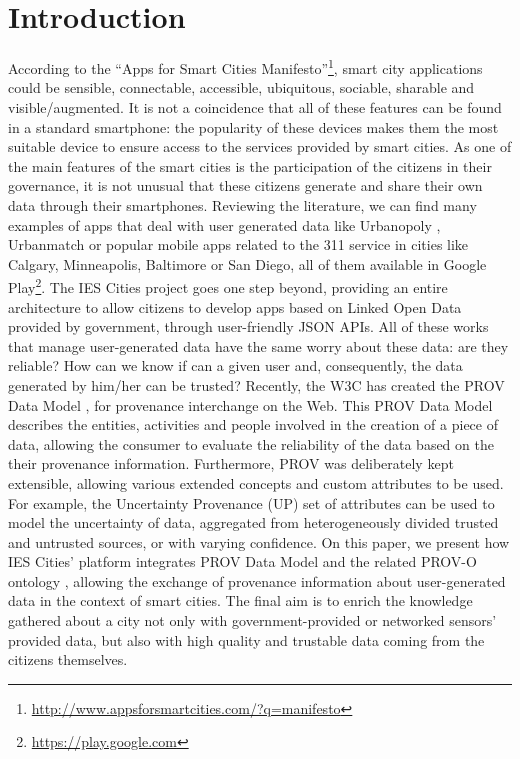 \section{Introduction}
\label{sec:introduction}

According to the ``Apps for Smart Cities Manifesto''\footnote{\url{http://www.appsforsmartcities.com/?q=manifesto}}, smart city applications could be sensible, connectable, accessible, ubiquitous, sociable, sharable and visible/augmented. It is not a coincidence that all of these features can be found in a standard smartphone: the popularity of these devices makes them the most suitable device to ensure access to the services provided by smart cities. As one of the main features of the smart cities is the participation of the citizens in their governance, it is not unusual that these citizens generate and share their own data through their smartphones. Reviewing the literature, we can find many examples of apps that deal with user generated data like Urbanopoly \cite{celino_urbanopoly_2012}, Urbanmatch \cite{celino_urbanmatch_2012} or popular mobile apps related to the 311 service in cities like Calgary, Minneapolis, Baltimore or San Diego, all of them available in Google Play\footnote{\url{https://play.google.com}}. The IES Cities project goes one step beyond, providing an entire architecture to allow citizens to develop apps based on Linked Open Data \cite{bizer_linked_2009} provided by government, through user-friendly JSON APIs. All of these works that manage user-generated data have the same worry about these data: are they reliable? How can we know if can a given user and, consequently, the data generated by him/her can be trusted? Recently, the W3C has created the PROV Data Model \cite{moreau_prov-dm:_2012}, for provenance interchange on the Web. This PROV Data Model describes the entities, activities and people involved in the creation of a piece of data, allowing the consumer to evaluate the reliability of the data based on the their provenance information. Furthermore, PROV was deliberately kept extensible, allowing various extended concepts and custom attributes to be used. For example, the Uncertainty Provenance (UP) \cite{de_nies_modeling_2013} set of attributes can be used to model the uncertainty of data, aggregated from heterogeneously divided trusted and untrusted sources, or with varying confidence. On this paper, we present how IES Cities' platform integrates PROV Data Model and the related PROV-O ontology \cite{lebo_prov-o:_2013}, allowing the exchange of provenance information about user-generated data in the context of smart cities. The final aim is to enrich the knowledge gathered about a city not only with government-provided or networked sensors’ provided data, but also with high quality and trustable data coming from the citizens themselves.

